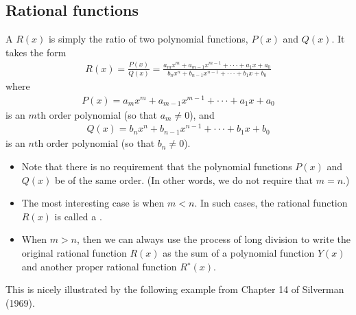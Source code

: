 \documentclass[letterpaper,10pt,english]{jupyterBook}
\begin{document}
\subsection{Rational functions}
\label{\detokenize{03.mappings_functions_correspondences:rational-functions}}
\sphinxAtStartPar
A  \(R(x)\) is simply the ratio of two polynomial functions, \(P(x)\) and \(Q(x)\). It takes the form
\begin{equation*}
\begin{split}
R(x) = \frac{P(x)}{Q(x)} = 
\frac{a_mx^m + a_{m−1} x^{m−1} + · · · + a_1 x + a_0}
{b_n x^n + b_{n−1} x^{n−1} + · · · + b_1 x + b_0}
\end{split}
\end{equation*}
\sphinxAtStartPar
where
\begin{equation*}
\begin{split} P(x) = a_mx^m + a_{m−1} x^{m−1} + · · · + a_1 x + a_0 \end{split}
\end{equation*}
\sphinxAtStartPar
is an \(m\)\sphinxhyphen{}th order polynomial (so that \(a_m \ne 0\)), and
\begin{equation*}
\begin{split} Q(x) =  b_n x^n + b_{n−1} x^{n−1} + · · · + b_1 x + b_0 \end{split}
\end{equation*}
\sphinxAtStartPar
is an \(n\)\sphinxhyphen{}th order polynomial (so that \(b_n \ne 0\)).
\begin{itemize}
\item {} 
\sphinxAtStartPar
Note that there is no requirement that the polynomial functions \(P(x)\) and \(Q(x)\) be of the same order. (In other words, we do not require that \(m = n\).)

\item {} 
\sphinxAtStartPar
The most interesting case is when \(m < n\). In such cases, the rational function \(R(x)\) is called a .

\item {} 
\sphinxAtStartPar
When \(m > n\), then we can always use the process of long division to write the original rational function \(R(x)\) as the sum of a polynomial function \(Y(x)\) and another proper rational function \(R^∗(x)\).

\end{itemize}

\sphinxAtStartPar
This is nicely illustrated by the following example from Chapter 14 of Silverman (1969).
\end{document}
